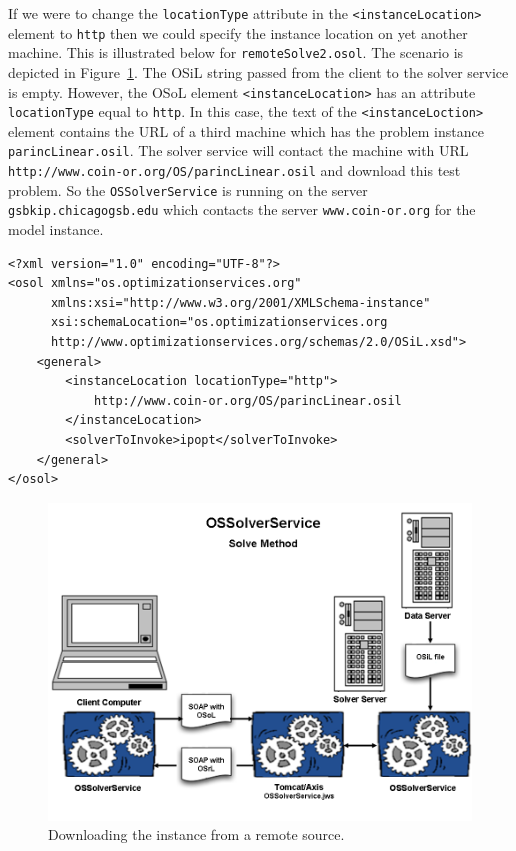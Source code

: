 \documentclass[11pt]{article}
\newcommand{\figurepath}{./figures}
\newcounter{Fig}
\renewcommand{\_}{{\char"5F}}
\renewcommand{\{}{{\char"7B}}
\renewcommand{\}}{{\char"7D}}
\renewcommand{\^}{{\char"0D}}
\renewcommand{\'}{{\char"0D}}
\newcommand{\UrlParinclinear}{http://www.coin-or.org/OS/parincLinear.osil}
\begin{document}
\begin{enumerate}[Step 1:]
If we were to change the {\tt locationType} attribute in the {\tt <instanceLocation>} element to {\tt http} then we
could specify the instance location on yet another machine. This is illustrated below  for {\tt remoteSolve2.osol}.
The scenario is depicted in Figure~\ref{figure:ossolverservice2}.  The OSiL string passed from the client to the solver
service is empty.  However, the OSoL element {\tt <instanceLocation>}  has an attribute {\tt locationType} equal to
{\tt http}.  In this case, the text of the {\tt <instanceLoction>} element contains the URL of a third machine which
has the problem instance {\tt parincLinear.osil}.  The solver service will contact the machine with URL
{\tt\UrlParinclinear} and download this test problem. So the {\tt OSSolverService} is
running on the server {\tt gsbkip.chicagogsb.edu} which contacts the server {\tt www.coin-or.org} for the model instance.
\begin{verbatim}
<?xml version="1.0" encoding="UTF-8"?>
<osol xmlns="os.optimizationservices.org"
      xmlns:xsi="http://www.w3.org/2001/XMLSchema-instance"
      xsi:schemaLocation="os.optimizationservices.org
      http://www.optimizationservices.org/schemas/2.0/OSiL.xsd">
    <general>
        <instanceLocation locationType="http">
            http://www.coin-or.org/OS/parincLinear.osil
        </instanceLocation>
        <solverToInvoke>ipopt</solverToInvoke>      
    </general>
</osol>
\end{verbatim}

\begin{figure}
\centering
\includegraphics[scale=0.5]{./figures/Figure11.png}
\caption{Downloading the instance from a remote source.}
\label{figure:ossolverservice2}
\end{figure}


\end{enumerate}
\end{document}
